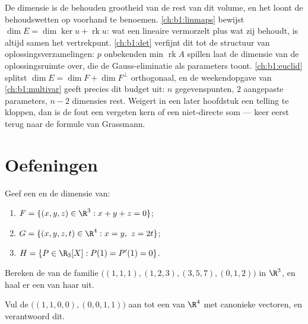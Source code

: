 \begin{remark}
\label{rem:b1:findim:perspectives}
De dimensie is de behouden grootheid van de rest van dit volume, en
het loont de behoudswetten op voorhand te benoemen.
\cref{ch:b1:linmaps} bewijst $\dim E = \dim\ker u +
\operatorname{rk} u$: wat een lineaire  vermorzelt plus
wat zij behoudt, is altijd samen het vertrekpunt.
\cref{ch:b1:det} verfijnt dit tot de structuur van
oplossingsverzamelingen: $p$ onbekenden min $\operatorname{rk} A$
spillen laat de dimensie van de oplossingsruimte over, die de
Gauss-eliminatie als  parameters toont. \cref{ch:b1:euclid}
splitst $\dim E = \dim F + \dim F^\perp$ orthogonaal, en de
weekendopgave van \cref{ch:b1:multivar} geeft precies dit budget
uit: $n$ gegevenspunten, $2$ aangepaste parameters, $n - 2$
dimensies rest. Weigert in een later hoofdstuk een telling te
kloppen, dan is de fout een vergeten kern of een niet-directe som
--- keer eerst terug naar de formule van Grassmann.
\end{remark}

\section{Oefeningen}

\begin{exercise}[$\star$]\label{exo:b1:findim:1}
Geef een  en de dimensie van:
\begin{enumerate}
  \item $F = \{(x,y,z) \in \R^3 : x + y + z = 0\}$;
  \item $G = \{(x,y,z,t) \in \R^4 : x = y,\ z = 2t\}$;
  \item $H = \{P \in \R_3[X] : P(1) = P'(1) = 0\}$.
\end{enumerate}
\end{exercise}

\begin{exercise}[$\star$]\label{exo:b1:findim:2}
Bereken de  van de familie $\bigl((1,1,1), (1,2,3), (3,5,7),
(0,1,2)\bigr)$ in $\R^3$, en haal er een  van haar 
uit.
\end{exercise}

\begin{exercise}[$\star$]\label{exo:b1:findim:3}
Vul de  $\bigl((1,1,0,0), (0,0,1,1)\bigr)$ aan tot een
 van $\R^4$ met canonieke vectoren, en verantwoord dit.
\end{exercise}

